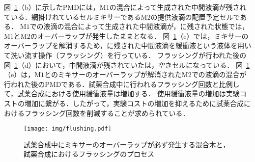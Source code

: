     図~\ref{fig:flushing}（b）に示したPMDには，M$1$の混合によって生成された中間液滴が残されている．網掛けれているセルミキサーであるM$2$の提供液滴の配置予定セルである．
    M$1$での液滴の混合によって生成された中間液滴が，に残された状態では，M$1$とM$2$のオーバーラップが発生したままとなる．
    図~\ref{fig:flushing}（c）では，ミキサーのオーバーラップを解消するため，に残された中間液滴を緩衝液という液体を用いて洗い流す操作（フラッシング）を行っている．
    フラッシングが行われた後の図~\ref{fig:flushing}（d）において，中間液滴が残されていたは，空きセルになっている．
    図~\ref{fig:flushing}（e）は，M$1$とのミキサーのオーバーラップが解消されたM$2$での液滴の混合が行われた後のPMDである．試薬合成中に行われるフラッシング回数と比例して，試薬合成における使用緩衝液量は増加する．
    使用緩衝液量の増加は実験コストの増加に繋がる．したがって，実験コストの増加を抑えるために試薬合成におけるフラッシング回数を削減することが求められている．

 \begin{figure}[tbp]
    \centering\texttt{[image: img/flushing.pdf]}
    \caption{試薬合成中にミキサーのオーバーラップが必ず発生する混合木と，試薬合成におけるフラッシングのプロセス}\label{fig:flushing}
    
\end{figure}

